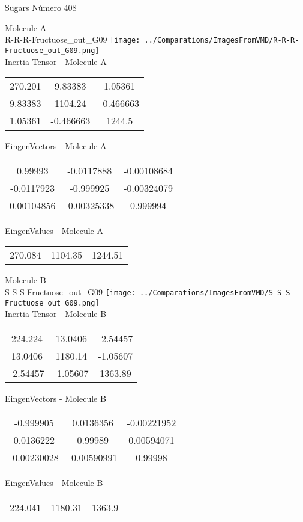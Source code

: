 \vtab[-2cm]
\begin{center}
{\large Sugars \tab Número 408}
\end{center}
\begin{multicols}{2}
\begin{center}

Molecule A \\ 
R-R-R-Fructuose\_out\_G09
\texttt{[image: ../Comparations/ImagesFromVMD/R-R-R-Fructuose\_out\_G09.png]}
\\
Inertia Tensor - Molecule A \\
\vtab

\begin{tabular}{|c c c|}
270.201	 & 	9.83383	 & 	1.05361	 \\
9.83383	 & 	1104.24	 & 	-0.466663	 \\
1.05361	 & 	-0.466663	 & 	1244.5
\end{tabular}

\vtab
 EingenVectors - Molecule A     \\
\vtab
\begin{tabular}{|c c c|}
0.99993	 & 	-0.0117888	 & 	-0.00108684	 \\
-0.0117923	 & 	-0.999925	 & 	-0.00324079	 \\
0.00104856	 & 	-0.00325338	 & 	0.999994
\end{tabular}

\vtab
 EingenValues - Molecule A     \\
\vtab
\begin{tabular}{|c c c|}
270.084	 & 	1104.35	 & 	1244.51	 \\
\end{tabular}
\columnbreak

Molecule B \\ 
S-S-S-Fructuose\_out\_G09
\texttt{[image: ../Comparations/ImagesFromVMD/S-S-S-Fructuose\_out\_G09.png]}
\\
Inertia Tensor - Molecule B \\
\vtab

\begin{tabular}{|c c c|}
224.224	 & 	13.0406	 & 	-2.54457	 \\
13.0406	 & 	1180.14	 & 	-1.05607	 \\
-2.54457	 & 	-1.05607	 & 	1363.89
\end{tabular}

\vtab
 EingenVectors - Molecule B     \\
\vtab
\begin{tabular}{|c c c|}
-0.999905	 & 	0.0136356	 & 	-0.00221952	 \\
0.0136222	 & 	0.99989	 & 	0.00594071	 \\
-0.00230028	 & 	-0.00590991	 & 	0.99998
\end{tabular}

\vtab
 EingenValues - Molecule B     \\
\vtab
\begin{tabular}{|c c c|}
224.041	 & 	1180.31	 & 	1363.9	 \\
\end{tabular}

\end{center}
\end{multicols}
